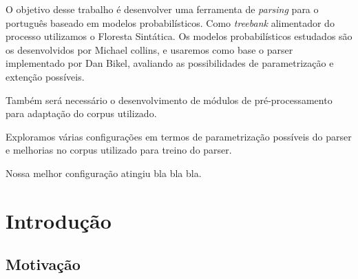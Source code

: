 \documentclass[a4paper]{abnt}
\begin{document}


\pagestyle{plain}


\begin{resumo}

O objetivo desse trabalho é desenvolver uma ferramenta de \emph{parsing} para o português baseado em modelos probabilísticos. Como \emph{treebank} alimentador do processo utilizamos o Floresta Sintática. Os modelos probabilísticos estudados são os desenvolvidos por Michael collins, e usaremos como base o parser implementado por Dan Bikel, avaliando as possibilidades de parametrização e extenção possíveis. 

Também será necessário o desenvolvimento de módulos de pré-processamento para adaptação do corpus utilizado.

Exploramos várias configurações em termos de parametrização possíveis do parser e melhorias no corpus utilizado para treino do parser.

Nossa melhor configuração atingiu bla bla bla. 

\end{resumo}









\tableofcontents
\listoffigures
\listoftables

%


\setcounter{page}{1}


\chapter{Introdução}
\label{cha:introducao}
    

\section{Motivação}
\label{cha:motivacao}
	
\end{document}
